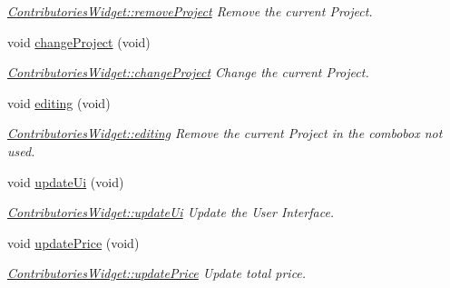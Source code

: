 \begin{DoxyCompactItemize}
\begin{DoxyCompactList}\small\item\em \hyperlink{classGui_1_1Widgets_1_1ContributoriesWidget_ad907c5827c4e1ee3b82adbe6f2f77309}{Contributories\-Widget\-::remove\-Project} Remove the current Project. \end{DoxyCompactList}\item 
\hypertarget{classGui_1_1Widgets_1_1ContributoriesWidget_a5a4be90c82f8b6d0b0e3b7a658a488ee}{void \hyperlink{classGui_1_1Widgets_1_1ContributoriesWidget_a5a4be90c82f8b6d0b0e3b7a658a488ee}{change\-Project} (void)}\label{classGui_1_1Widgets_1_1ContributoriesWidget_a5a4be90c82f8b6d0b0e3b7a658a488ee}

\begin{DoxyCompactList}\small\item\em \hyperlink{classGui_1_1Widgets_1_1ContributoriesWidget_a5a4be90c82f8b6d0b0e3b7a658a488ee}{Contributories\-Widget\-::change\-Project} Change the current Project. \end{DoxyCompactList}\item 
\hypertarget{classGui_1_1Widgets_1_1ContributoriesWidget_acb1cc99ae6f72205394d7b52f0a5f20d}{void \hyperlink{classGui_1_1Widgets_1_1ContributoriesWidget_acb1cc99ae6f72205394d7b52f0a5f20d}{editing} (void)}\label{classGui_1_1Widgets_1_1ContributoriesWidget_acb1cc99ae6f72205394d7b52f0a5f20d}

\begin{DoxyCompactList}\small\item\em \hyperlink{classGui_1_1Widgets_1_1ContributoriesWidget_acb1cc99ae6f72205394d7b52f0a5f20d}{Contributories\-Widget\-::editing} Remove the current Project in the combobox not used. \end{DoxyCompactList}\item 
\hypertarget{classGui_1_1Widgets_1_1ContributoriesWidget_a5231cbde89d73ccdbb734e6aee0cb3ff}{void \hyperlink{classGui_1_1Widgets_1_1ContributoriesWidget_a5231cbde89d73ccdbb734e6aee0cb3ff}{update\-Ui} (void)}\label{classGui_1_1Widgets_1_1ContributoriesWidget_a5231cbde89d73ccdbb734e6aee0cb3ff}

\begin{DoxyCompactList}\small\item\em \hyperlink{classGui_1_1Widgets_1_1ContributoriesWidget_a5231cbde89d73ccdbb734e6aee0cb3ff}{Contributories\-Widget\-::update\-Ui} Update the User Interface. \end{DoxyCompactList}\item 
\hypertarget{classGui_1_1Widgets_1_1ContributoriesWidget_ad6c925eaf605e1b0382b0ec00eac5abf}{void \hyperlink{classGui_1_1Widgets_1_1ContributoriesWidget_ad6c925eaf605e1b0382b0ec00eac5abf}{update\-Price} (void)}\label{classGui_1_1Widgets_1_1ContributoriesWidget_ad6c925eaf605e1b0382b0ec00eac5abf}

\begin{DoxyCompactList}\small\item\em \hyperlink{classGui_1_1Widgets_1_1ContributoriesWidget_ad6c925eaf605e1b0382b0ec00eac5abf}{Contributories\-Widget\-::update\-Price} Update total price. \end{DoxyCompactList}\end{DoxyCompactItemize}
